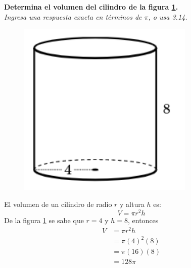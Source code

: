 \textbf{Determina el volumen del cilindro de la figura \ref{fig:vol_cil_08}.}\\
\textit{Ingresa una respuesta exacta en términos de $\pi$, o usa 3.14.}\\

\begin{minipage}[t]{0.3\linewidth}
    \begin{figure}[H]
        \centering
        \includegraphics[width=0.75\textwidth]{../images/vol_cil_08.png}
        \caption{}
        \label{fig:vol_cil_08}
    \end{figure}
\end{minipage}%
\begin{minipage}[t]{0.7\linewidth}
    \begin{solutionbox}{5cm}        El volumen de un cilindro de radio $r$ y altura $h$ es:
        \begin{equation*}
            V = \pi r^2 h
        \end{equation*}
        De la figura \ref{fig:vol_cil_08} se sabe que $r=4$ y $h=8$, entonces
        \begin{equation*}
            \begin{split}
                V & = \pi r^2 h\\
                & = \pi (4)^2 (8)\\
                & = \pi (16) (8)\\
                & = 128\pi
            \end{split}
        \end{equation*}
    \end{solutionbox}
\end{minipage}%